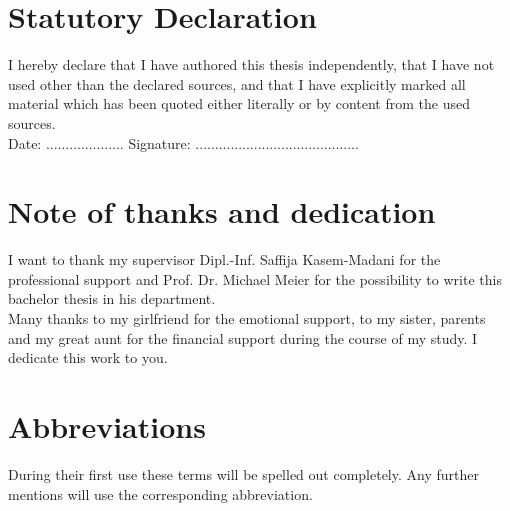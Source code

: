 \documentclass[12pt,a4paper]{scrartcl}				%
\begin{document}
\newpage
{}

\section*{Statutory Declaration}

I hereby declare that I have authored this thesis independently, that I have not used other than the declared sources, and that I have explicitly marked all material which has been quoted either literally or by content from the used sources. \\[4ex]

Date: ....................      
\hspace*{1cm}
Signature: ..........................................
\clearpage

\section*{Note of thanks and dedication}

I want to thank my supervisor Dipl.-Inf. Saffija Kasem-Madani for the professional support and Prof. Dr. Michael Meier for the possibility to write this bachelor thesis in his department. \\
Many thanks to my girlfriend for the emotional support, to my sister, parents and my great aunt for the financial support during the course of my study. I dedicate this work to you.
\clearpage

\section*{Abbreviations}
During their first use these terms will be spelled out completely. Any further mentions will use the corresponding abbreviation.

\begin{acronym}[AAAA] 							%
\end{acronym}
\clearpage
\end{document}
